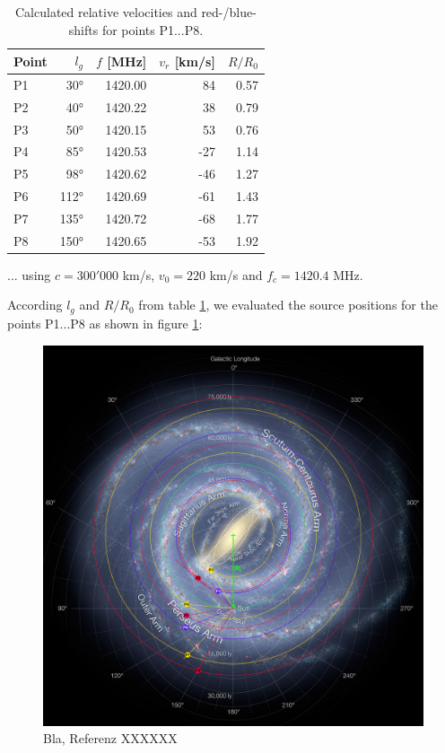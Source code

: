 \begin{table}[H]
\centering \footnotesize
\begin{tabular}{l r  r  r  r }
    \toprule
    Point & $l_g$ & $f$ [MHz] & $v_r$ [km/s] & $R/R_0$\\
    \midrule
    P1    &  30°  & 1420.00   &  84          & 0.57 \\
    P2    &  40°  & 1420.22   &  38          & 0.79 \\
    P3    &  50°  & 1420.15   &  53          & 0.76 \\
    P4    &  85°  & 1420.53   & -27          & 1.14 \\
    P5    &  98°  & 1420.62   & -46          & 1.27 \\
    P6    & 112°  & 1420.69   & -61          & 1.43 \\
    P7    & 135°  & 1420.72   & -68          & 1.77 \\
    P8    & 150°  & 1420.65   & -53          & 1.92 \\
    \bottomrule
\end{tabular}
\caption{Calculated relative velocities and red-/blue-shifts for points P1...P8.}
\label{tab:hot_spots}
\end{table}

... using $c=300'000$ km/s, $v_0 = 220$ km/s and $f_c=1420.4$ MHz.

\pagebreak

According $l_g$ and $R/R_0$ from table \ref{tab:hot_spots}, we evaluated the source positions for the points P1...P8 as shown in figure \ref{fig:mw_roi_spots}:

\begin{figure}[H]
    \centering
    \includegraphics[width=\textwidth]{assets/MW_ROI_spots.png}
    \caption{Bla, Referenz XXXXXX}
    \label{fig:mw_roi_spots}
\end{figure}

